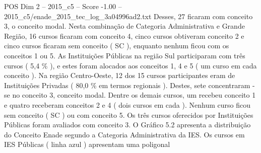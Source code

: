 \begin{textsample}{POS Dim 2 – 2015\_c5 – Score -1.00 – 2015\_c5/enade\_2015\_tec\_log\_3a04996ad2.txt}
Desses, 27 ficaram com conceito 3, o conceito modal.
Nesta combinação de Categoria Administrativa e Grande Região, 16 cursos ficaram com conceito 4, cinco cursos obtiveram conceito 2 e cinco cursos ficaram sem conceito ( SC ), enquanto nenhum ficou com os conceitos 1 ou 5.
As Instituições Públicas na região Sul participaram com três cursos ( 5,4 \% ), e estes foram alocados aos conceitos 1, 4 e 5 ( um curso em cada conceito ).
Na região Centro-Oeste, 12 dos 15 cursos participantes eram de Instituições Privadas ( 80,0 \% em termos regionais ).
Destes, sete concentraram -se no conceito 3, conceito modal.
Dentre os demais cursos, um recebeu conceito 1 e quatro receberam conceitos 2 e 4 ( dois cursos em cada ).
Nenhum curso ficou sem conceito ( SC ) ou com conceito 5.
Os três cursos oferecidos por Instituições Públicas foram avaliados com conceito 3.
O Gráfico 5.2 apresenta a distribuição do Conceito Enade segundo a Categoria Administrativa da IES.
Os cursos em IES Públicas ( linha azul ) apresentam uma poligonal

\end{textsample}
